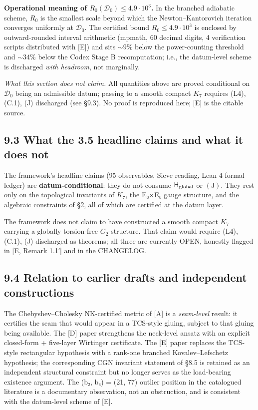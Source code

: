 \documentclass[11pt,a4paper]{article}
\begin{document}
\textbf{Operational meaning of \(R_0(\mathcal D_0) \le 4.9 \cdot 10^3\).} In the branched adiabatic scheme, \(R_0\) is the smallest scale beyond which the Newton--Kantorovich iteration converges uniformly at \(\mathcal D_0\). The certified bound \(R_0 \le 4.9 \cdot 10^3\) is enclosed by outward-rounded interval arithmetic (mpmath, 60 decimal digits, 4 verification scripts distributed with {[}E{]}) and sits \(\sim 9\%\) below the power-counting threshold and \(\sim 34\%\) below the Codex Stage B recomputation; i.e., the datum-level scheme is discharged \emph{with headroom}, not marginally.

\emph{What this section does not claim.} All quantities above are proved conditional on \(\mathcal D_0\) being an admissible datum; passing to a smooth compact \(K_7\) requires (L4), (C.1), (J) discharged (see §9.3). No proof is reproduced here; {[}E{]} is the citable source.

\subsection{9.3 What the 3.5 headline claims and what it does not}\label{what-the-3.5-headline-claims-and-what-it-does-not}

The framework's headline claims (95 observables, Sieve reading, Lean 4 formal ledger) are \textbf{datum-conditional}: they do not consume \(\mathsf H_{\rm global}\) or \((\mathrm J)\). They rest only on the topological invariants of \(K_7\), the E₈×E₈ gauge structure, and the algebraic constraints of §2, all of which are certified at the datum layer.

The framework does not claim to have constructed a smooth compact \(K_7\) carrying a globally torsion-free \(G_2\)-structure. That claim would require (L4), (C.1), (J) discharged as theorems; all three are currently OPEN, honestly flagged in {[}E, Remark 1.1′{]} and in the CHANGELOG.

\subsection{9.4 Relation to earlier drafts and independent constructions}\label{relation-to-earlier-drafts-and-independent-constructions}

The Chebyshev--Cholesky NK-certified metric of {[}A{]} is a \emph{seam-level} result: it certifies the seam that would appear in a TCS-style gluing, subject to that gluing being available. The {[}D{]} paper strengthens the neck-level ansatz with an explicit closed-form + five-layer Wirtinger certificate. The {[}E{]} paper replaces the TCS-style rectangular hypothesis with a rank-one branched Kovalev--Lefschetz hypothesis; the corresponding CGN invariant statement of §8.5 is retained as an independent structural constraint but no longer serves as the load-bearing existence argument. The (b₂, b₃) = (21, 77) outlier position in the catalogued literature is a documentary observation, not an obstruction, and is consistent with the datum-level scheme of {[}E{]}.
\end{document}
